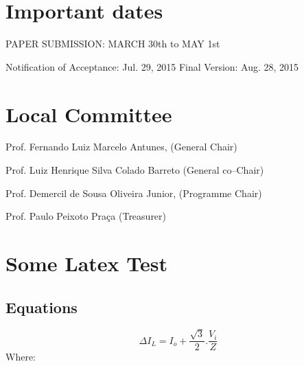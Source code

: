 \documentclass[letterpaper,oneside,onecolumn,draftclsnofoot,12pt,conference]{IEEEtran}
\begin{document}




\section{Important dates }

PAPER SUBMISSION: MARCH 30th to MAY 1st

Notification of Acceptance:     Jul. 29, 2015 Final Version:	Aug. 28, 2015






\section*{Local Committee}


Prof. Fernando Luiz Marcelo Antunes, (General Chair)  
 
Prof. Luiz Henrique Silva Colado Barreto (General co--Chair) 

Prof. Demercil de Sousa Oliveira Junior, (Programme Chair)

Prof. Paulo Peixoto Praça (Treasurer)





\section{Some Latex Test}

 
 \subsection{Equations}
 \begin{equation}
 \Delta I_{L}=I_{o}+\frac{\sqrt{3}}{2}.\frac{V_{i}}{Z}
 \end{equation}
 Where:
 
\end{document}
